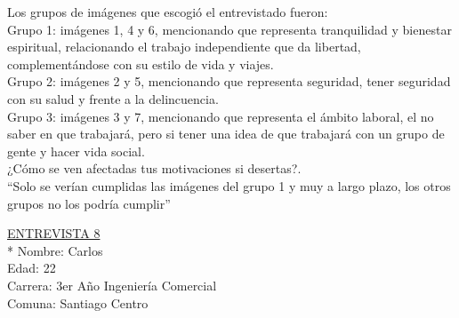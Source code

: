 Los grupos de imágenes que escogió el entrevistado fueron:\\

Grupo 1: imágenes 1, 4 y 6, mencionando que representa tranquilidad y bienestar espiritual, relacionando el trabajo independiente que da libertad, complementándose con su estilo de vida y viajes.  \\

Grupo 2: imágenes 2 y 5, mencionando que representa seguridad, tener seguridad con su salud y frente a la delincuencia.\\

Grupo 3: imágenes 3 y 7, mencionando que representa el ámbito laboral, el no saber en que trabajará, pero si tener una idea de que trabajará con un grupo de gente y hacer vida social.\\

¿Cómo se ven afectadas tus motivaciones si desertas?.\\

``Solo se verían cumplidas las imágenes del grupo 1 y muy a largo plazo, los otros grupos no los podría cumplir''


\underline {ENTREVISTA 8}\\*
Nombre: Carlos\\
Edad: 22 \\
Carrera: 3er Año Ingeniería Comercial\\
Comuna: Santiago Centro\\

